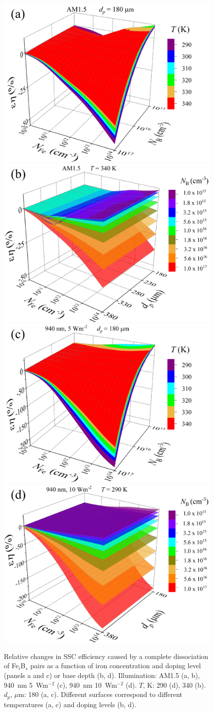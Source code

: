 \documentclass[a4paper,fleqn]{cas-sc}
\begin{document}
\begin{figure}
	\centering
     \includegraphics[width=0.49\linewidth]{Fig10a.png}
     \includegraphics[width=0.49\linewidth]{Fig10b.png}
     \includegraphics[width=0.49\linewidth]{Fig10c.png}
     \includegraphics[width=0.49\linewidth]{Fig10d.png}
	  \caption{Relative changes in SSC efficiency caused by a complete
       dissociation of Fe$_i$B$_s$ pairs as a function of
       iron concentration and
       doping level (panels a and c) or base depth (b, d).
       Illumination: AM1.5 (a, b), 940~nm 5~Wm$^{-2}$ (c),  940~nm 10~Wm$^{-2}$ (d).
       $T$, K: 290 (d), 340 (b).
       $d_p$, $\mu$m: 180 (a, c).
       Different surfaces correspond to different temperatures (a, c) and doping levels (b, d).
}\label{fig10}
\end{figure}
\end{document}
